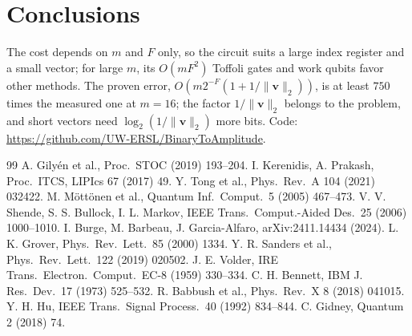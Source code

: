 \documentclass[9pt,twocolumn]{extarticle}
\newcommand{\norm}[1]{\lVert #1\rVert}
\begin{document}
\section{Conclusions}\label{sec:concl}

The cost depends on $m$ and $F$ only, so the circuit suits a large index
register and a small vector; for large $m$, its $O(mF^2)$ Toffoli gates and
work qubits favor other methods. The proven error,
$O(m2^{-F}(1 + 1/\norm{\bm v}_2))$, is at least $750$ times the measured one
at $m = 16$; the factor $1/\norm{\bm v}_2$ belongs to the problem, and
short vectors need $\log_2(1/\norm{\bm v}_2)$ more bits. Code:
\url{https://github.com/UW-ERSL/BinaryToAmplitude}.

\footnotesize
\begin{thebibliography}{99}\setlength{\itemsep}{0pt}
 A. Gily\'en et al., Proc.\ STOC (2019) 193--204.
 I. Kerenidis, A. Prakash, Proc.\ ITCS, LIPIcs 67 (2017) 49.
 Y. Tong et al., Phys.\ Rev.\ A 104 (2021) 032422.
 M. M\"ott\"onen et al., Quantum Inf.\ Comput.\ 5 (2005) 467--473.
 V. V. Shende, S. S. Bullock, I. L. Markov, IEEE Trans.\ Comput.-Aided Des.\ 25 (2006) 1000--1010.
 I. Burge, M. Barbeau, J. Garcia-Alfaro, arXiv:2411.14434 (2024).
 L. K. Grover, Phys.\ Rev.\ Lett.\ 85 (2000) 1334.
 Y. R. Sanders et al., Phys.\ Rev.\ Lett.\ 122 (2019) 020502.
 J. E. Volder, IRE Trans.\ Electron.\ Comput.\ EC-8 (1959) 330--334.
 C. H. Bennett, IBM J. Res.\ Dev.\ 17 (1973) 525--532.
 R. Babbush et al., Phys.\ Rev.\ X 8 (2018) 041015.
 Y. H. Hu, IEEE Trans.\ Signal Process.\ 40 (1992) 834--844.
 C. Gidney, Quantum 2 (2018) 74.
\end{thebibliography}
\end{document}
